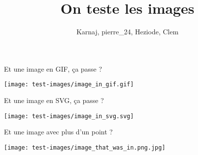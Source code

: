 \documentclass[small]{zmdocument}
\title{On teste les images}
\author{Karnaj, pierre\_24, Heziode, Clem}
\begin{document}
\maketitle
\tableofcontents

\begin{LevelOneIntroduction}
\end{LevelOneIntroduction}


Et une image en GIF, ça passe ?

\begin{center}
\texttt{[image: test-images/image\_in\_gif.gif]}
\end{center}

Et une image en SVG, ça passe ?

\begin{center}
\texttt{[image: test-images/image\_in\_svg.svg]}
\end{center}

Et une image avec plus d'un point ?

\begin{center}
\texttt{[image: test-images/image\_that\_was\_in.png.jpg]}
\end{center}
\end{document}
